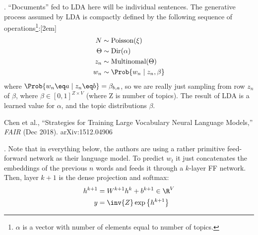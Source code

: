 \documentclass[11pt]{article}
\begin{document}
. ``Documents'' fed to LDA here will be individual sentences. The generative process assumed by LDA is compactly defined by the following sequence of operations\footnote{$\alpha$ is a vector with number of elements equal to number of topics.}:[2em]
\begin{align}
N &\sim \text{Poisson}(\xi) \\
\Theta &\sim \text{Dir}(\alpha) \\
z_n &\sim \text{Multinomal}(\Theta) \\
w_n &\sim \Prob{w_n \mid z_n, \beta}
\end{align}
where $\Prob{w_n \eq a \mid z_n \eq b} = \beta_{b, a}$, so we are really just sampling from row $z_n$ of $\beta$, where $\beta \in [0, 1]^{Z \times V}$ (where Z is number of topics). The result of LDA is a learned value for $\alpha$, and the topic distributions $\beta$.









\vspace{-1em}
{\footnotesize Chen et al., ``Strategies for Training Large Vocabulary Neural Language Models,'' \textit{FAIR} (Dec 2018). arXiv:1512.04906}


. Note that in everything below, the authors are using a rather primitive feed-forward network as their language model. To predict $w_t$ it just concatenates the embeddings of the previous $n$ words and feeds it through a $k$-layer FF network. Then, layer $k+1$ is the dense projection and softmax:
\begin{align}
h^{k+1} &= W^{k+1} h^k + b^{k+1} \in \R^V \\
y &= \inv{Z} \exp\left\{ h^{k+1}  \right\}
\end{align}
\end{document}
